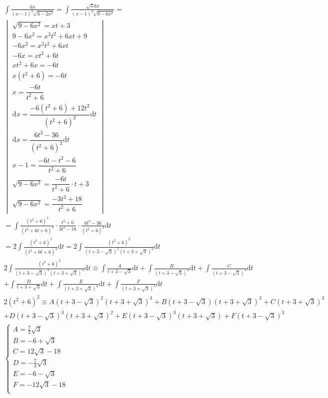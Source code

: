 

\begin{gather*}
\int{\frac{\mbox{d}x}{(x-1)^3\sqrt{3-2x^2}}}
= \int{\frac{\sqrt{3}\mbox{d}x}{(x-1)^3\sqrt{9-6x^2}}} = \\
\begin{vmatrix}
  \sqrt{9-6x^2}=xt+3\\
  9-6x^2=x^2t^2+6xt+9\\
  -6x^2=x^2t^2+6xt\\
  -6x=xt^2+6t\\
  xt^2+6x=-6t\\
  x(t^2+6)=-6t\\
  x=\dfrac{-6t}{t^2+6}\\
  \mbox{d}x=\dfrac{-6(t^2+6)+12t^2}{(t^2+6)^2}\mbox{d}t\\
  \mbox{d}x=\dfrac{6t^2-36}{(t^2+6)^2}\mbox{d}t\\
  x-1=\dfrac{-6t-t^2-6}{t^2+6}\\
  \sqrt{9-6x^2}= \dfrac{-6t}{t^2+6} \cdot t+3 \\
  \sqrt{9-6x^2}= \dfrac{-3t^2+18}{t^2+6}
\end{vmatrix} \\
= \int{\frac{(t^2+6)^3}{(t^2+6t+6)^3}\cdot\frac{t^2+6}{3t^2-18}\cdot\frac{6t^2-36}{(t^2+6)^2}\mbox{d}t}\\
= 2\int{\frac{(t^2+6)^2}{(t^2+6t+6)^3}\mbox{d}t} = 2\int{\frac{(t^2+6)^2}{(t+3-\sqrt{3})^3(t+3+\sqrt{3})^3}\mbox{d}t} \\
2 \int{\frac{(t^2+6)^2}{(t+3-\sqrt{3})^3(t+3+\sqrt{3})^3}\mbox{d}t}
\equiv \int{\frac{A}{t+3-\sqrt{3}}\mbox{d}t}+\int{\frac{B}{(t+3-\sqrt{3})^2}\mbox{d}t}+\int{\frac{C}{(t+3-\sqrt{3})^3}\mbox{d}t}\\
+\int{\frac{D}{t+3+\sqrt{3}}\mbox{d}t}+\int{\frac{E}{(t+3+\sqrt{3})^2}\mbox{d}t}+\int{\frac{F}{(t+3+\sqrt{3})^3}\mbox{d}t}\\
2(t^2+6)^2 \equiv A(t+3-\sqrt{3})^2(t+3+\sqrt{3})^3+B(t+3-\sqrt{3})(t+3+\sqrt{3})^3+C(t+3+\sqrt{3})^3\\+D(t+3-\sqrt{3})^3(t+3+\sqrt{3})^2+E(t+3-\sqrt{3})^3(t+3+\sqrt{3})+F(t+3-\sqrt{3})^3\\
\begin{cases}
  A=\frac{7}{3}\sqrt{3}\\
  B=-6+\sqrt{3}\\
  C=12\sqrt{3}-18\\
  D=-\frac{7}{3}\sqrt{3}\\
  E=-6-\sqrt{3}\\
  F=-12\sqrt{3}-18\\

\end{cases}
\end{gather*}
